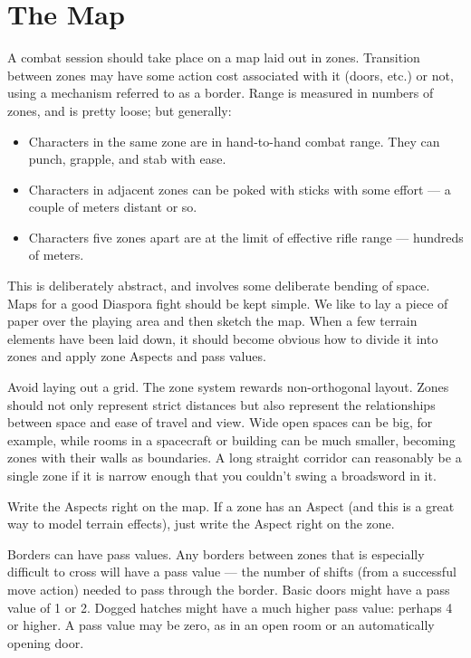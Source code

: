 \section{The Map}
\label{sec:personal-combat-map}

A combat session should take place on a map laid out in zones. Transition between zones may have some action cost associated with it (doors, etc.) or not, using a mechanism referred to as a border. Range is measured in numbers of zones, and is pretty loose; but generally:

\begin{itemize}
\item Characters in the same zone are in hand-to-hand combat range. They can punch, grapple, and stab with ease.
\item Characters in adjacent zones can be poked with sticks with some effort --- a couple of meters distant or so.
\item Characters five zones apart are at the limit of effective rifle range --- hundreds of meters.
\end{itemize}

This is deliberately abstract, and involves some deliberate bending of space. Maps for a good Diaspora fight should be kept simple. We like to lay a piece of paper over the playing area and then sketch the map. When a few terrain elements have been laid down, it should become obvious how to divide it into zones and apply zone Aspects and pass values.

Avoid laying out a grid. The zone system rewards non-orthogonal layout. Zones should not only represent strict distances but also represent the relationships between space and ease of travel and view. Wide open spaces can be big, for example, while rooms in a spacecraft or building can be much smaller, becoming zones with their walls as boundaries. A long straight corridor can reasonably be a single zone if it is narrow enough that you couldn't swing a broadsword in it.



Write the Aspects right on the map. If a zone has an Aspect (and this is a great way to model terrain effects), just write the Aspect right on the zone.

Borders can have pass values. Any borders between zones that is especially difficult to cross will have a pass value --- the number of shifts (from a successful move action) needed to pass through the border. Basic doors might have a pass value of 1 or 2. Dogged hatches might have a much higher pass value: perhaps 4 or higher. A pass value may be zero, as in an open room or an automatically opening door.

